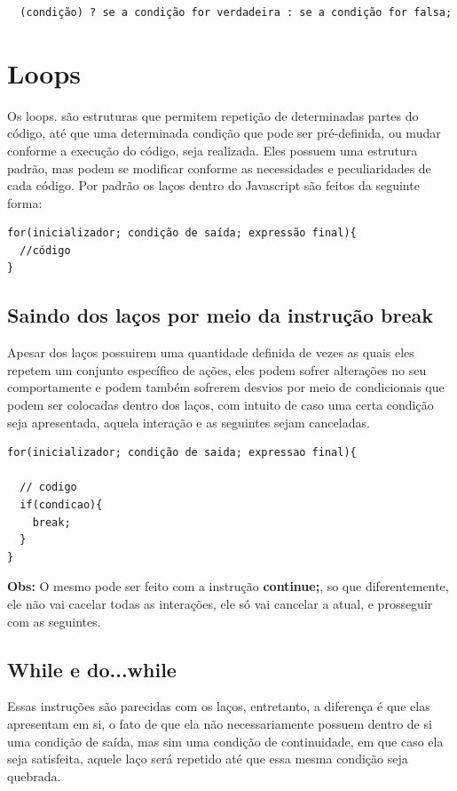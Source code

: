 \documentclass[12pt, a4paper]{paper}
\begin{document}
\begin{verbatim}
  (condição) ? se a condição for verdadeira : se a condição for falsa;
\end{verbatim}

\section{Loops} %
\label{sec:Loops}
Os loops. são estruturas que permitem repetição de determinadas partes do código, 
até que uma determinada condição que pode ser pré-definida, ou mudar conforme a 
execução do código, seja realizada. Eles possuem uma estrutura padrão, mas podem se 
modificar conforme as necessidades e peculiaridades de cada código. Por padrão 
os laços dentro do Javascript são feitos da seguinte forma: 

\begin{verbatim}
for(inicializador; condição de saída; expressão final){
  //código
}

\end{verbatim}

\subsection{Saindo dos laços por meio da instrução break}
\label{sub:Saindo dos laços por meio da instrução break} %
Apesar dos laços possuirem uma quantidade definida de vezes as quais eles repetem um 
conjunto específico de ações, eles podem sofrer alterações no seu comportamente e 
podem também sofrerem desvios por meio de condicionais que podem ser colocadas dentro 
dos laços, com intuito de caso uma certa condição seja apresentada, aquela interação 
e as seguintes sejam canceladas.

\begin{verbatim}
for(inicializador; condição de saida; expressao final){

  // codigo
  if(condicao){
    break;
  }
}

\end{verbatim}


\textbf{Obs:} O mesmo pode ser feito com a instrução \textbf{continue;}, so que 
diferentemente, ele não vai cacelar todas as interações, ele só vai cancelar a atual, 
e prosseguir com as seguintes.


\subsection{While e do...while}
\label{While e do...while}
Essas instruções são parecidas com os laços, entretanto, a diferença é que elas 
apresentam em si, o fato de que ela não necessariamente possuem dentro de si uma 
condição de saída, mas sim uma condição de continuidade, em que caso ela seja 
satisfeita, aquele laço será repetido até que essa mesma condição seja quebrada. 
\end{document}
